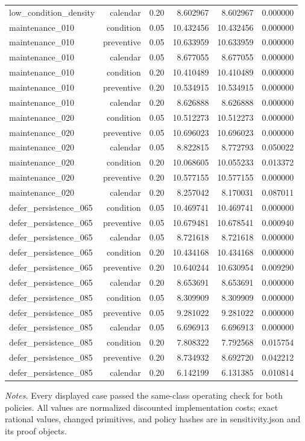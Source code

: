 {\begin{longtable}{lrrrrr}
low\_condition\_density & calendar & 0.20 & 8.602967 & 8.602967 & 0.000000 \\
maintenance\_010 & condition & 0.05 & 10.432456 & 10.432456 & 0.000000 \\
maintenance\_010 & preventive & 0.05 & 10.633959 & 10.633959 & 0.000000 \\
maintenance\_010 & calendar & 0.05 & 8.677055 & 8.677055 & 0.000000 \\
maintenance\_010 & condition & 0.20 & 10.410489 & 10.410489 & 0.000000 \\
maintenance\_010 & preventive & 0.20 & 10.534915 & 10.534915 & 0.000000 \\
maintenance\_010 & calendar & 0.20 & 8.626888 & 8.626888 & 0.000000 \\
maintenance\_020 & condition & 0.05 & 10.512273 & 10.512273 & 0.000000 \\
maintenance\_020 & preventive & 0.05 & 10.696023 & 10.696023 & 0.000000 \\
maintenance\_020 & calendar & 0.05 & 8.822815 & 8.772793 & 0.050022 \\
maintenance\_020 & condition & 0.20 & 10.068605 & 10.055233 & 0.013372 \\
maintenance\_020 & preventive & 0.20 & 10.577155 & 10.577155 & 0.000000 \\
maintenance\_020 & calendar & 0.20 & 8.257042 & 8.170031 & 0.087011 \\
defer\_persistence\_065 & condition & 0.05 & 10.469741 & 10.469741 & 0.000000 \\
defer\_persistence\_065 & preventive & 0.05 & 10.679481 & 10.678541 & 0.000940 \\
defer\_persistence\_065 & calendar & 0.05 & 8.721618 & 8.721618 & 0.000000 \\
defer\_persistence\_065 & condition & 0.20 & 10.434168 & 10.434168 & 0.000000 \\
defer\_persistence\_065 & preventive & 0.20 & 10.640244 & 10.630954 & 0.009290 \\
defer\_persistence\_065 & calendar & 0.20 & 8.653691 & 8.653691 & 0.000000 \\
defer\_persistence\_085 & condition & 0.05 & 8.309909 & 8.309909 & 0.000000 \\
defer\_persistence\_085 & preventive & 0.05 & 9.281022 & 9.281022 & 0.000000 \\
defer\_persistence\_085 & calendar & 0.05 & 6.696913 & 6.696913 & 0.000000 \\
defer\_persistence\_085 & condition & 0.20 & 7.808322 & 7.792568 & 0.015754 \\
defer\_persistence\_085 & preventive & 0.20 & 8.734932 & 8.692720 & 0.042212 \\
defer\_persistence\_085 & calendar & 0.20 & 6.142199 & 6.131385 & 0.010814 \\
\bottomrule\end{longtable}}
\noindent\emph{Notes.} Every displayed case passed the same-class operating check for both policies. All values are normalized discounted implementation costs; exact rational values, changed primitives, and policy hashes are in sensitivity.json and its proof objects.
